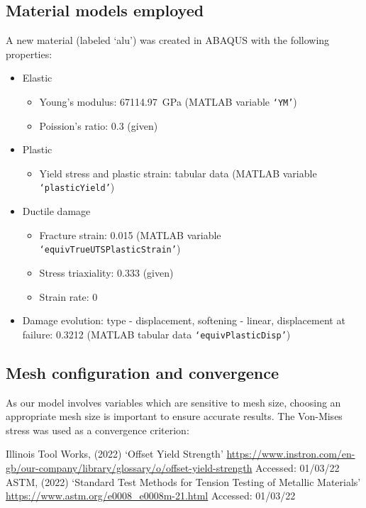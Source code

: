 \documentclass[11pt]{article}
\numberwithin{equation}{section}
\begin{document}
\subsection{Material models employed}
A new material (labeled `alu') was created in ABAQUS with the following properties:
\begin{itemize}
    \item Elastic
    \begin{itemize}
        \item Young's modulus: \SI{67114.97}{\giga\pascal} (MATLAB variable \texttt{`YM'})
        \item Poission's ratio: 0.3 (given)
    \end{itemize}
    \item Plastic
    \begin{itemize}
        \item Yield stress and plastic strain: tabular data (MATLAB variable \texttt{`plasticYield'})
    \end{itemize}
    \item Ductile damage
    \begin{itemize}
        \item Fracture strain: 0.015 (MATLAB variable \texttt{`equivTrueUTSPlasticStrain'})
        \item Stress triaxiality: 0.333 (given)
        \item Strain rate: 0
    \end{itemize}
    \item Damage evolution: type - displacement, softening - linear, displacement at failure: 0.3212 (MATLAB tabular data \texttt{`equivPlasticDisp'})
\end{itemize}
\subsection{Mesh configuration and convergence}
As our model involves variables which are sensitive to mesh size, choosing an appropriate mesh size is important to ensure accurate results. The Von-Mises stress was used as a convergence criterion: 
\newpage
\begin{thebibliography}{00}
     Illinois Tool Works, (2022) `Offset Yield Strength' \url{https://www.instron.com/en-gb/our-company/library/glossary/o/offset-yield-strength} Accessed: 01/03/22
     ASTM, (2022) `Standard Test Methods for Tension Testing of Metallic Materials' \url{https://www.astm.org/e0008_e0008m-21.html} Accessed: 01/03/22
\end{thebibliography}
\end{document}
